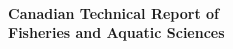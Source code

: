 \thispagestyle{fancyplain}
\noindent
\begin{flushleft}
\LARGE
\textbf{\titlecap{\trTitle{}}}\\
\vfill
\Large
\trAuthsLong{}
\vfill
\trAddy{}
\vfill
\trYear{}
\vfill
\LARGE
\textbf{Canadian Technical Report of\\
Fisheries and Aquatic Sciences \trReportNum{}}
\cfoot{}
\end{flushleft}
\clearpage

